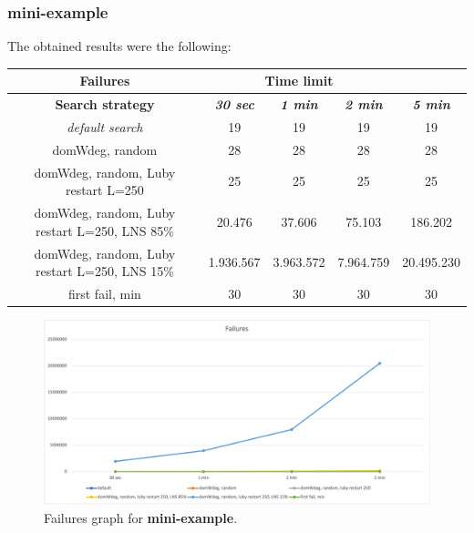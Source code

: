 \subsubsection{mini-example}
The obtained results were the following:
{
\renewcommand{\arraystretch}{2}
\begin{longtable}[h]{| c | c | c | c | c |}
    \hline
    \textbf{Failures} & \multicolumn{3}{c}{Time limit} & \\
    \hline
    \textbf{Search strategy} & \textbf{\textit{30 sec}} & \textbf{\textit{1 min}} & \textbf{\textit{2 min}} & \textbf{\textit{5 min}} \\
    \hline
    \endhead
    \textit{default search}                       &      19 &      19 &      19 &       19 \\
    \hline
    domWdeg, random                               &      28 &      28 &      28 &       28 \\
    \hline
    domWdeg, random, Luby restart L=250           &      25 &      25 &      25 &       25 \\
    \hline
    domWdeg, random, Luby restart L=250, LNS 85\% &   20.476 &   37.606 &   75.103 &   186.202 \\
    \hline
    domWdeg, random, Luby restart L=250, LNS 15\% & 1.936.567 & 3.963.572 & 7.964.759 & 20.495.230 \\
    \hline
    first fail, min                               &      30 &      30 &      30 &       30 \\
    \hline
\end{longtable}
}
\begin{figure}[H]
    \centering
    \includegraphics[width=0.8\columnwidth]{../graphs/mini-example-failures.png}
    \caption{Failures graph for \textbf{mini-example}.}
\end{figure}
